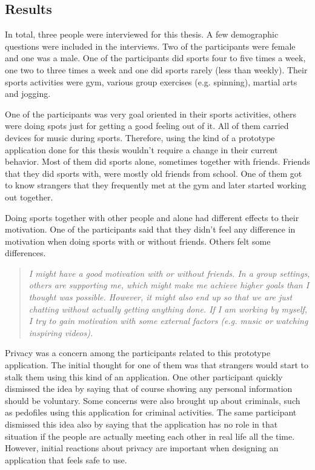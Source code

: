 \subsection{Results}

In total, three people were interviewed for this thesis. A few demographic questions were included in the interviews. Two of the participants were female and one was  a male. One of the participants did sports four to five times a week, one two to three times a week and one did sports rarely (less than weekly). Their sports activities were gym, various group exercises (e.g. spinning), martial arts and jogging.

One of the participants was very goal oriented in their sports activities, others were doing spots just for getting a good feeling out of it. All of them carried devices for music during sports. Therefore, using the kind of a prototype application done for this thesis wouldn't require a change in their current behavior. Most of them did sports alone, sometimes together with friends. Friends that they did sports with, were mostly old friends from school. One of them got to know strangers that they frequently met at the gym and later started working out together.

Doing sports together with other people and alone had different effects to their motivation. One of the participants said that they didn't feel any difference in motivation when doing sports with or without friends. Others felt some differences.

\begin{quotation}
\it I might have a good motivation with or without friends. In a group settings, others are supporting me, which might make me achieve higher goals than I thought was possible. However, it might also end up so that we are just chatting without actually getting anything done. If I am working by myself, I try to gain motivation with some external factors (e.g. music or watching inspiring videos).
\end{quotation}

Privacy was a concern among the participants related to this prototype application. The initial thought for one of them was that strangers would start to stalk them using this kind of an application. One other participant quickly dismissed the idea by saying that of course showing any personal information should be voluntary. Some concerns were also brought up about criminals, such as pedofiles using this application for criminal activities. The same participant dismissed this idea also by saying that the application has no role in that situation if the people are actually meeting each other in real life all the time. However, initial reactions about privacy are important when designing an application that feels safe to use.

